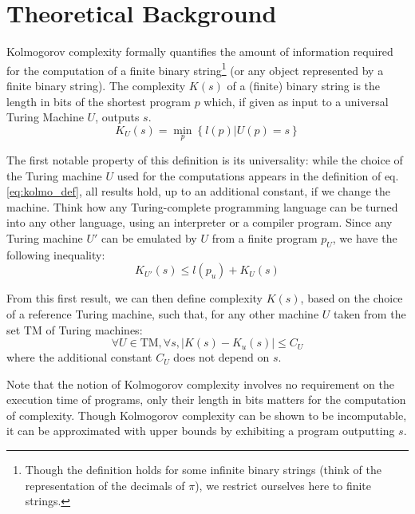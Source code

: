 \documentclass[conference]{IEEEtran}
\begin{document}
\section{Theoretical Background}
\label{sec:theory}
Kolmogorov complexity formally quantifies the amount of information required
for the computation of a finite binary string\footnote{Though the definition
holds for some infinite binary strings (think of the representation of the
decimals of $\pi$), we restrict ourselves here to finite strings.} (or
any object represented by a finite binary
string)\cite{kolmogorov_three_1965,li_introduction_2008}. The complexity $K(s)$ of a (finite) binary string is the length in bits of the shortest program $p$
which, if given as input to a universal Turing Machine $U$, outputs $s$.
\begin{equation}
  \label{eq:kolmo_def}
  K_{U}(s) = \min_{p}\left\{l(p)|U(p)=s\right\}
\end{equation}

The first notable property of this definition is its universality: while the
choice of the Turing machine $U$ used for the computations appears in the
definition of eq. \ref{eq:kolmo_def}, all results hold, up to an additional
constant, if we change the machine. Think how any Turing-complete programming language can
be turned into any other language, using an interpreter or a compiler program. Since any
Turing machine $U'$ can be emulated by $U$ from a
finite program $p_{U}$, we have the following inequality:
\begin{equation}
  \label{eq:inequality_univ}
K_{U'}(s) \le l(p_{u}) + K_{U}(s)
\end{equation}

From this first result, we can then define complexity $K(s)$, based on the choice of a reference Turing machine, such that, for any other
machine $U$ taken from the set $\text{TM}$ of Turing machines:
\begin{equation}
  \forall U\in\text{TM}, \forall s, |K(s) - K_{u}(s)| \le C_{U}
\end{equation}
where the additional constant $C_{U}$ does not depend on $s$.

Note that the notion of Kolmogorov complexity involves no requirement on the execution time of
programs, only their length in bits matters for the computation of
complexity. Though Kolmogorov complexity can be shown to be
incomputable\cite{li_introduction_2008},
it can be approximated with
upper bounds by exhibiting a program outputting $s$.
\end{document}
